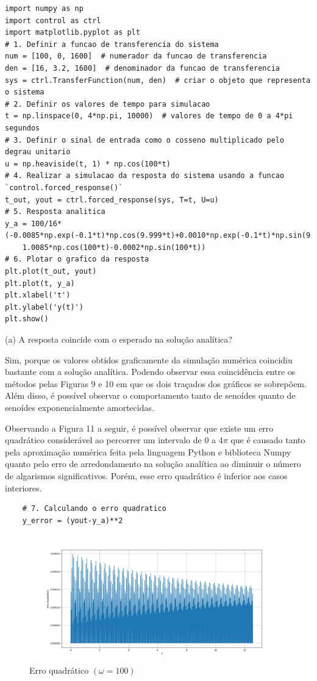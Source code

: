 \documentclass[10pt]{article}
\begin{document}
\begin{lstlisting}
import numpy as np
import control as ctrl
import matplotlib.pyplot as plt
# 1. Definir a funcao de transferencia do sistema
num = [100, 0, 1600]  # numerador da funcao de transferencia
den = [16, 3.2, 1600]  # denominador da funcao de transferencia
sys = ctrl.TransferFunction(num, den)  # criar o objeto que representa o sistema
# 2. Definir os valores de tempo para simulacao
t = np.linspace(0, 4*np.pi, 10000)  # valores de tempo de 0 a 4*pi segundos
# 3. Definir o sinal de entrada como o cosseno multiplicado pelo degrau unitario
u = np.heaviside(t, 1) * np.cos(100*t)
# 4. Realizar a simulacao da resposta do sistema usando a funcao `control.forced_response()`
t_out, yout = ctrl.forced_response(sys, T=t, U=u)
# 5. Resposta analitica
y_a = 100/16*(-0.0085*np.exp(-0.1*t)*np.cos(9.999*t)+0.0010*np.exp(-0.1*t)*np.sin(9.999*t)+
    1.0085*np.cos(100*t)-0.0002*np.sin(100*t))
# 6. Plotar o grafico da resposta
plt.plot(t_out, yout)
plt.plot(t, y_a)
plt.xlabel('t')
plt.ylabel('y(t)')
plt.show()
\end{lstlisting}

(a) A resposta coincide com o esperado na solução analítica?

\quad Sim, porque os valores obtidos graficamente da simulação numérica coincidiu bastante com a solução analítica.
Podendo observar essa coincidência entre os métodos pelas Figuras 9 e 10 em que os dois traçados dos gráficos se sobrepõem.
Além disso, é possível observar o comportamento tanto de senoídes quanto de senoídes exponencialmente amortecidas.

\quad Observando a Figura 11 a seguir, é possível observar que existe um erro quadrático considerável
ao percorrer um intervalo de 0 a 4$\pi$ que é causado tanto pela aproximação numérica feita pela linguagem Python e biblioteca Numpy
quanto pelo erro de arredondamento na solução analítica ao diminuir o número de algarismos significativos.
Porém, esse erro quadrático é inferior aos casos interiores.

\begin{lstlisting}
    # 7. Calculando o erro quadratico
    y_error = (yout-y_a)**2
\end{lstlisting}

\begin{figure}[h]
    \centering
    \includegraphics[scale=0.4]{erro4.png}
    \caption{Erro quadrático $(\omega = 100)$}
\end{figure}
\end{document}
